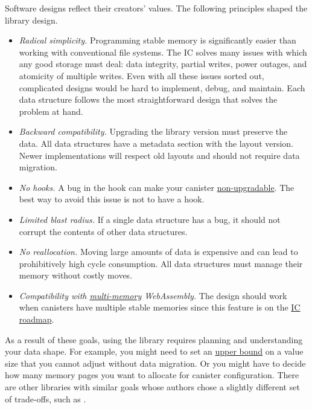 \documentclass{article}
\begin{document}
Software designs reflect their creators' values.
The following principles shaped the  library design.
\begin{itemize}
  \item
    \label{radical-simplicity}
    \emph{Radical simplicity.}
    Programming stable memory is significantly easier than working with conventional file systems.
    The IC solves many issues with which any good storage must deal: data integrity, partial writes, power outages, and atomicity of multiple writes.
    Even with all these issues sorted out, complicated designs would be hard to implement, debug, and maintain.
    Each data structure follows the most straightforward design that solves the problem at hand.
  \item
    \label{backward-compatibility}
    \emph{Backward compatibility.}
    Upgrading the library version must preserve the data.
    All data structures have a metadata section with the layout version.
    Newer implementations will respect old layouts and should not require data migration.
  \item
    \emph{No  hooks.}
    A bug in the  hook can make your canister \href{/posts/01-effective-rust-canisters.html#upgrade-hook-panics}{non-upgradable}.
    The best way to avoid this issue is not to have a  hook.
  \item
    \emph{Limited blast radius.}
    If a single data structure has a bug, it should not corrupt the contents of other data structures.
  \item
    \emph{No reallocation.}
    Moving large amounts of data is expensive and can lead to prohibitively high cycle consumption.
    All data structures must manage their memory without costly moves.
  \item
    \emph{Compatibility with \href{https://github.com/WebAssembly/multi-memory/blob/master/proposals/multi-memory/Overview.md}{multi-memory} WebAssembly.}
    The design should work when canisters have multiple stable memories since this feature is on the \href{https://forum.dfinity.org/t/proposal-wasm-native-stable-memory/15966#proposal-7}{IC roadmap}.
\end{itemize}

As a result of these goals, using the library requires planning and understanding your data shape.
For example, you might need to set an \href{#max-size-attribute}{upper bound} on a value size that you cannot adjust without data migration.
Or you might have to decide how many memory pages you want to allocate for canister configuration.
There are other libraries with similar goals whose authors chose a slightly different set of trade-offs, such as \href{https://crates.io/crates/ic-stable-memory}{}.
\end{document}
